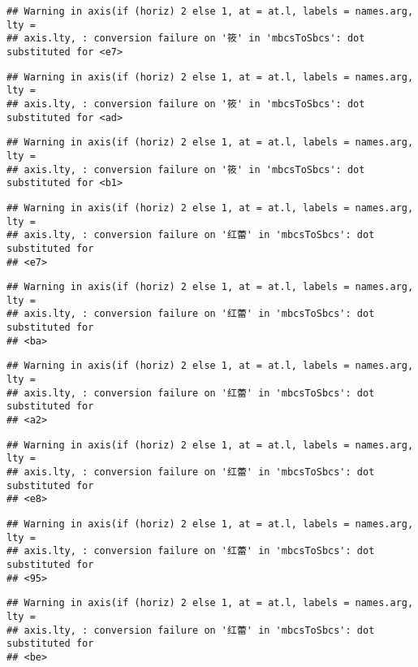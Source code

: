 \documentclass[
]{article}
\begin{document}
\begin{verbatim}
## Warning in axis(if (horiz) 2 else 1, at = at.l, labels = names.arg, lty =
## axis.lty, : conversion failure on '筱' in 'mbcsToSbcs': dot substituted for <e7>
\end{verbatim}

\begin{verbatim}
## Warning in axis(if (horiz) 2 else 1, at = at.l, labels = names.arg, lty =
## axis.lty, : conversion failure on '筱' in 'mbcsToSbcs': dot substituted for <ad>
\end{verbatim}

\begin{verbatim}
## Warning in axis(if (horiz) 2 else 1, at = at.l, labels = names.arg, lty =
## axis.lty, : conversion failure on '筱' in 'mbcsToSbcs': dot substituted for <b1>
\end{verbatim}

\begin{verbatim}
## Warning in axis(if (horiz) 2 else 1, at = at.l, labels = names.arg, lty =
## axis.lty, : conversion failure on '红蕾' in 'mbcsToSbcs': dot substituted for
## <e7>
\end{verbatim}

\begin{verbatim}
## Warning in axis(if (horiz) 2 else 1, at = at.l, labels = names.arg, lty =
## axis.lty, : conversion failure on '红蕾' in 'mbcsToSbcs': dot substituted for
## <ba>
\end{verbatim}

\begin{verbatim}
## Warning in axis(if (horiz) 2 else 1, at = at.l, labels = names.arg, lty =
## axis.lty, : conversion failure on '红蕾' in 'mbcsToSbcs': dot substituted for
## <a2>
\end{verbatim}

\begin{verbatim}
## Warning in axis(if (horiz) 2 else 1, at = at.l, labels = names.arg, lty =
## axis.lty, : conversion failure on '红蕾' in 'mbcsToSbcs': dot substituted for
## <e8>
\end{verbatim}

\begin{verbatim}
## Warning in axis(if (horiz) 2 else 1, at = at.l, labels = names.arg, lty =
## axis.lty, : conversion failure on '红蕾' in 'mbcsToSbcs': dot substituted for
## <95>
\end{verbatim}

\begin{verbatim}
## Warning in axis(if (horiz) 2 else 1, at = at.l, labels = names.arg, lty =
## axis.lty, : conversion failure on '红蕾' in 'mbcsToSbcs': dot substituted for
## <be>
\end{verbatim}
\end{document}
